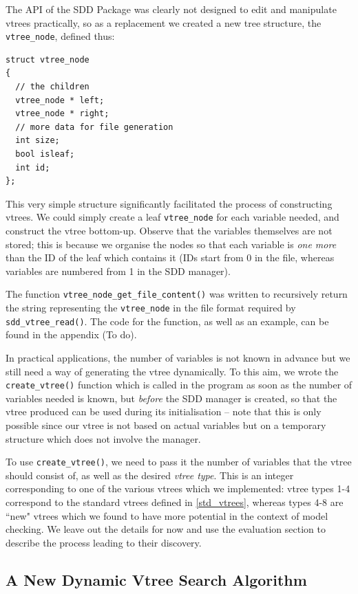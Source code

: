 \documentclass[11pt]{report}
\begin{document}
The API of the SDD Package was clearly not designed to edit and manipulate vtrees practically, so as a replacement we created a new tree structure, the \texttt{vtree\_node}, defined thus: 
\begin{verbatim}
struct vtree_node 
{
  // the children
  vtree_node * left; 
  vtree_node * right;
  // more data for file generation
  int size;
  bool isleaf;
  int id;
};
\end{verbatim}

This very simple structure significantly facilitated the process of constructing vtrees. We could simply create a leaf \texttt{vtree\_node} for each variable needed, and construct the vtree bottom-up. Observe that the variables themselves are not stored; this is because we organise the nodes so that each variable is \textit{one more} than the ID of the leaf which contains it (IDs start from 0 in the file, whereas variables are numbered from 1 in the SDD manager).

 The function \texttt{vtree\_node\_get\_file\_content()} was written to recursively return the string representing the \texttt{vtree\_node} in the file format required by \texttt{sdd\_vtree\_read()}. The code for the function, as well as an example, can be found in the appendix (To do). 

In practical applications, the number of variables is not known in advance but we still need a way of generating the vtree dynamically. To this aim, we wrote the \texttt{create\_vtree()} function which is called in the program as soon as the number of variables needed is known, but \textit{before} the SDD manager is created, so that the vtree produced can be used during its initialisation -- note that this is only possible since our vtree is not based on actual variables but on a temporary structure which does not involve the manager. 

To use \texttt{create\_vtree()}, we need to pass it the number of variables that the vtree should consist of, as well as the desired \textit{vtree type}. This is an integer corresponding to one of the various vtrees which we implemented: vtree types 1-4 correspond to the standard vtrees defined in \ref{std_vtrees}, whereas types 4-8 are ``new" vtrees which we found to have more potential in the context of model checking. We leave out the details for now and use the evaluation section to describe the process leading to their discovery. 

\subsection{A New Dynamic Vtree Search Algorithm}
\label{dynamic_with_sdds_implementation}
\end{document}
